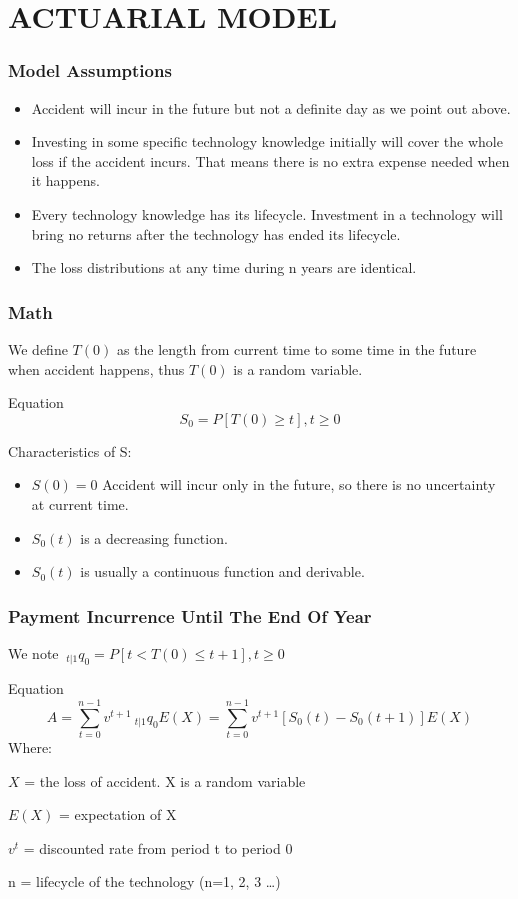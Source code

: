 \documentclass[slidestop,compress,mathserif,table]{beamer}
\begin{document}
\section{ACTUARIAL MODEL}

\begin{frame}
  \frametitle{Model Assumptions}
  \begin{itemize}
  \item Accident will incur in the future but not a definite day as we
    point out above.
    \item Investing in some specific technology knowledge initially will cover
      the whole loss if the accident incurs. That means there is no
      extra expense needed when it happens.
      \item Every technology knowledge has its lifecycle. Investment in a
        technology will bring no returns after the technology has
        ended its lifecycle.
        \item The loss distributions at any time during n years are identical.
  \end{itemize}
\end{frame}

\begin{frame}
  \frametitle{Math}
We define $T(0)$ as the length from current time to some time in the
future when accident happens, thus $T(0)$ is a random variable.
\begin{exampleblock}{Equation}
  \begin{equation}
    S_0=P[T(0)\ge t], t \ge 0
  \end{equation}
\end{exampleblock}
Characteristics of S:
\begin{itemize}
\item $S(0)=0$ Accident will incur only in the future, so there is no
  uncertainty at current time.
  \item $S_0(t)$ is a decreasing function.
    \item  $S_0(t)$ is usually a continuous function and derivable.
\end{itemize}
\end{frame}


\begin{frame}
  \frametitle{Payment Incurrence Until The End Of Year}

We note $ \ _{t|1}q_0=P[t<T(0) \le t+1], t \ge 0 $
  \begin{exampleblock}{Equation}
    \begin{equation}
      A=\sum_{t=0}^{n-1}v^{t+1} \ _{t|1}q_0E(X)=\sum_{t=0}^{n-1}v^{t+1}[S_0(t)-S_0(t+1)]E(X)
    \end{equation}
Where:

$X$ = the loss of accident. X is a random variable

$E(X)$ = expectation of X

$v^t$ = discounted rate from period t to period 0

n = lifecycle of the technology (n=1, 2, 3 \ldots)
  \end{exampleblock}
\end{frame}
\end{document}
